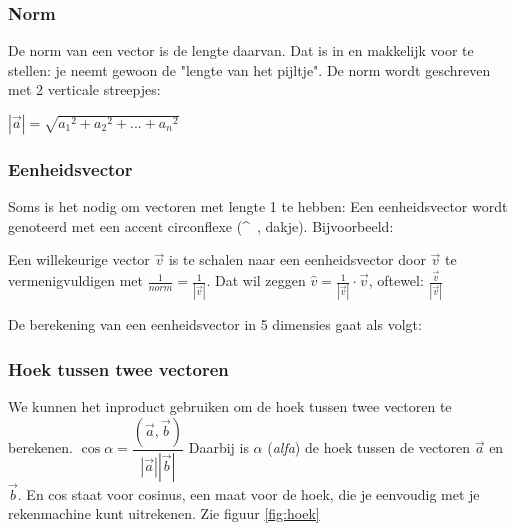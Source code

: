 \subsubsection{Norm}
De norm van een vector is de lengte daarvan. Dat is in \RD en \RT makkelijk  voor te stellen: je neemt gewoon de "lengte van het pijltje". De norm wordt geschreven met 2 verticale streepjes:

{$|\vec{a}| = \sqrt{ {a_1}^{2} + {a_2}^{2} + . . . +{a_n}^{2}}$ }


\subsubsection{Eenheidsvector}
Soms is het nodig om vectoren met lengte 1 te hebben:
Een eenheidsvector wordt genoteerd met een accent circonflexe (\textasciicircum \ , dakje). Bijvoorbeeld:


Een willekeurige vector $ \vec{v} $  is te schalen naar een eenheidsvector door $ \vec{v} $   te vermenigvuldigen met $ \frac{1}{norm} =  \frac{1}{ |\vec{v}|} $. 
Dat wil zeggen $\hat{v} =  \frac{1}{|\vec{v}|}\cdot\vec{v}$, oftewel: $\frac{\vec{v}}{|\vec{v}|}$ 

De berekening van een eenheidsvector in 5 dimensies gaat als volgt:


\subsubsection{Hoek tussen twee vectoren}
We kunnen het inproduct gebruiken om de hoek tussen twee vectoren te berekenen. 
{\quad  
	$\cos \alpha = \dfrac{(\vec{a}, \vec{b}) }{|\vec{a}| |\vec{b}|} $}
Daarbij is $\alpha$ (\textit{alfa}) de hoek tussen de vectoren $\vec{a}$ en $\vec{b}.$ En cos staat voor cosinus, een maat voor de hoek, die je eenvoudig met je rekenmachine kunt uitrekenen. Zie figuur \ref{fig:hoek}

